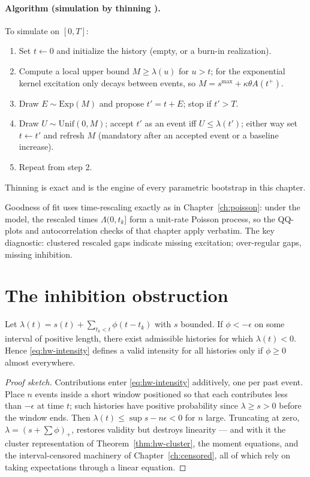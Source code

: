 \paragraph{Algorithm (simulation by thinning \cite{lewis1979,ogata1988}).}
To simulate on $[0,T]$:
\begin{enumerate}
\item Set $t \leftarrow 0$ and initialize the history (empty, or a burn-in realization).
\item Compute a local upper bound $M \ge \lambda(u)$ for $u > t$; for the exponential
kernel excitation only decays between events, so $M = s^{\max} + \kappa\theta A(t^+)$.
\item Draw $E \sim \mathrm{Exp}(M)$ and propose $t' = t + E$; stop if $t' > T$.
\item Draw $U \sim \mathrm{Unif}(0, M)$; accept $t'$ as an event iff $U \le \lambda(t')$;
either way set $t \leftarrow t'$ and refresh $M$ (mandatory after an accepted event or a
baseline increase).
\item Repeat from step 2.
\end{enumerate}
Thinning is exact and is the engine of every parametric bootstrap in this chapter.

Goodness of fit uses time-rescaling exactly as in Chapter~\ref{ch:poisson}: under the
model, the rescaled times $\Lambda(0, t_k]$ form a unit-rate Poisson process, so the
QQ-plots and autocorrelation checks of that chapter apply verbatim. The key diagnostic:
clustered rescaled gaps indicate missing excitation; over-regular gaps, missing
inhibition.

\section{The inhibition obstruction}
\label{sec:hw-inhib}

\begin{proposition}
\label{prop:hw-nonneg}
Let $\lambda(t) = s(t) + \sum_{t_k<t} \phi(t-t_k)$ with $s$ bounded. If $\phi < -\epsilon$
on some interval of positive length, there exist admissible histories for which
$\lambda(t) < 0$. Hence \eqref{eq:hw-intensity} defines a valid intensity for all histories
only if $\phi \ge 0$ almost everywhere.
\end{proposition}

\begin{proof}[Proof sketch]
Contributions enter \eqref{eq:hw-intensity} additively, one per past event. Place $n$
events inside a short window positioned so that each contributes less than $-\epsilon$ at
time $t$; such histories have positive probability since $\lambda \ge s > 0$ before the
window ends. Then $\lambda(t) \le \sup s - n\epsilon < 0$ for $n$ large. Truncating at
zero, $\lambda = (s + \sum \phi)_+$, restores validity but destroys linearity --- and with
it the cluster representation of Theorem~\ref{thm:hw-cluster}, the moment equations, and
the interval-censored machinery of Chapter~\ref{ch:censored}, all of which rely on taking
expectations through a linear equation.
\end{proof}

